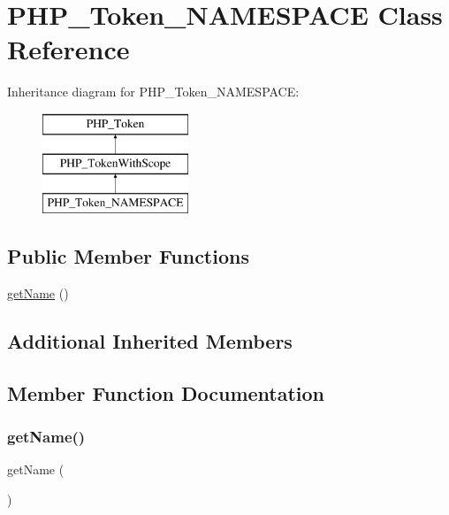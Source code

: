 \hypertarget{class_p_h_p___token___n_a_m_e_s_p_a_c_e}{}\section{P\+H\+P\+\_\+\+Token\+\_\+\+N\+A\+M\+E\+S\+P\+A\+CE Class Reference}
\label{class_p_h_p___token___n_a_m_e_s_p_a_c_e}
Inheritance diagram for P\+H\+P\+\_\+\+Token\+\_\+\+N\+A\+M\+E\+S\+P\+A\+CE\+:\begin{figure}[H]
\begin{center}
\leavevmode
\includegraphics[height=3.000000cm]{class_p_h_p___token___n_a_m_e_s_p_a_c_e}
\end{center}
\end{figure}
\subsection*{Public Member Functions}
\begin{DoxyCompactItemize}
\item 
\mbox{\hyperlink{class_p_h_p___token___n_a_m_e_s_p_a_c_e_a3d0963e68bb313b163a73f2803c64600}{get\+Name}} ()
\end{DoxyCompactItemize}
\subsection*{Additional Inherited Members}


\subsection{Member Function Documentation}
\mbox{\label{class_p_h_p___token___n_a_m_e_s_p_a_c_e_a3d0963e68bb313b163a73f2803c64600}} 
\subsubsection{\texorpdfstring{get\+Name()}{getName()}}
{\footnotesize\ttfamily get\+Name (\begin{DoxyParamCaption}{ }\end{DoxyParamCaption})}


